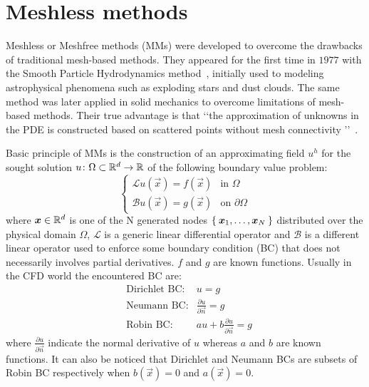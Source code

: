 \chapter{Meshless methods}\label{chap:meshless_methods}

Meshless or Meshfree methods (MMs) were developed to overcome the drawbacks of traditional mesh-based methods.
They appeared for the first time in $1977$ with the Smooth Particle Hydrodynamics method~\cite{Belytschko:meshless_overview}, initially used to modeling astrophysical phenomena such as exploding stars and dust clouds. The same method was later applied in solid mechanics to overcome limitations of mesh-based methods. Their true advantage is that \lq\lq the approximation of unknowns in the PDE is constructed based on scattered points without mesh connectivity \rq\rq~\cite{Chen:meshless_overview_after_20_years}.

Basic principle of MMs is the construction of an approximating field $u^{h}$ for the sought solution $u\colon\Omega\subset \mathbb{R}^{d}\to\mathbb{R}$ of the following boundary value problem:
\begin{equation}
	\label{eqn:generic_continous_PDE}
	\begin{cases}
		\mathcal{L} u(\vec{x})  = f(\vec{x})		& \text{in $\Omega$} \\
		\mathcal{B}u(\vec{x})   = g(\vec{x})	     & \text{on $\partial\Omega$}
	\end{cases}
\end{equation}
where $\boldsymbol{x} \in \mathbb{R}^{d}$ is one of the N generated nodes $\Set{\boldsymbol{x}_1, \dots, \boldsymbol{x}_N}$ distributed over the physical domain $\Omega$, $\mathcal{L}$ is a generic linear differential operator and $\mathcal{B}$ is a different linear operator used to enforce some boundary condition (BC) that does not necessarily involves partial derivatives. $f$ and $g$ are known functions.
Usually in the CFD world the encountered BC are:
\begin{align}
	& \text{Dirichlet BC:} & u=g  \\
	& \text{Neumann BC:} & \frac{\partial u}{\partial \vec{n}} = g  \\
	& \text{Robin BC:} & au + b\frac{\partial u}{\partial \vec{n}} = g
\end{align}
where $\frac{\partial u}{\partial \vec{n}}$ indicate the normal derivative of $u$ whereas $a$ and $b$ are known functions. It can also be noticed that Dirichlet and Neumann BCs are subsets of Robin BC respectively when $b(\vec{x})=0$ and $a(\vec{x})=0$.

